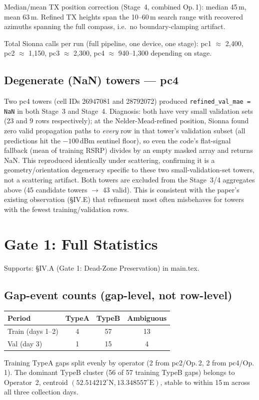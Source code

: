 \documentclass[11pt]{article}
\begin{document}
Median/mean TX position correction (Stage~4, combined Op.\,1):
median 45\,m, mean 63\,m. Refined TX heights span the 10--60\,m search
range with recovered azimuths spanning the full compass, i.e.\ no
boundary-clamping artifact.

Total Sionna calls per run (full pipeline, one device, one stage):
pc1 $\approx$ 2{,}400, pc2 $\approx$ 1{,}150, pc3 $\approx$ 2{,}300,
pc4 $\approx$ 940--1{,}300 depending on stage.

\subsection{Degenerate (NaN) towers — pc4}
\label{sec:nan}

Two pc4 towers (cell IDs 26947081 and 28792072) produced
\texttt{refined\_val\_mae = NaN} in both Stage~3 and Stage~4. Diagnosis:
both have very small validation sets (23 and 9 rows respectively); at the
Nelder-Mead-refined position, Sionna found zero valid propagation paths
to \emph{every} row in that tower's validation subset (all predictions
hit the $-100$\,dBm sentinel floor), so even the code's flat-signal
fallback (mean of training RSRP) divides by an empty masked array and
returns NaN. This reproduced identically under scattering, confirming it
is a geometry/orientation degeneracy specific to these two
small-validation-set towers, not a scattering artifact. Both towers are
excluded from the Stage~3/4 aggregates above (45 candidate towers $\to$
43 valid). This is consistent with the paper's existing observation
(\S IV.E) that refinement most often misbehaves for towers with the
fewest training/validation rows.

\section{Gate 1: Full Statistics}
\label{sec:gate1full}

Supports: \S IV.A (Gate 1: Dead-Zone Preservation) in main.tex.

\subsection{Gap-event counts (gap-level, not row-level)}
\begin{center}
\begin{tabular}{lccc}
\toprule
Period & TypeA & TypeB & Ambiguous \\
\midrule
Train (days 1--2) & 4 & 57 & 13 \\
Val (day 3)        & 1 & 15 & 4 \\
\bottomrule
\end{tabular}
\end{center}
Training TypeA gaps split evenly by operator (2 from pc2/Op.\,2, 2 from
pc4/Op.\,1). The dominant TypeB cluster (56 of 57 training TypeB gaps)
belongs to Operator~2, centroid $(52.514212^\circ\text{N}, 13.348557^\circ\text{E})$,
stable to within 15\,m across all three collection days.
\end{document}
